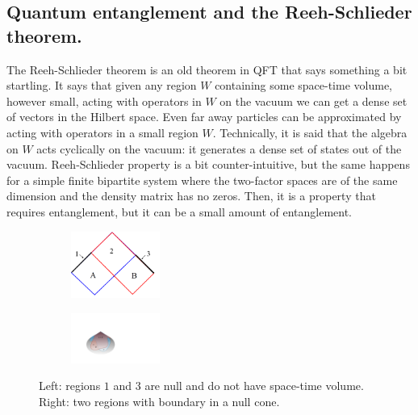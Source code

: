 \documentclass[11pt]{article}
\numberwithin{equation}{section}
\begin{document}
\subsection{Quantum entanglement and the Reeh-Schlieder theorem.}

The Reeh-Schlieder theorem is an old theorem in QFT that says something a bit startling. It says that given any region $W$ containing some space-time volume, however small, acting with operators in $W$ on the vacuum we can get a dense set of vectors in the Hilbert space. Even far away particles can be approximated by acting with operators in a small region $W$. Technically, it is said that the algebra on $W$ acts cyclically on the vacuum: it generates a dense set of states out of the vacuum. Reeh-Schlieder property is a bit counter-intuitive, but the same happens for a simple finite bipartite system where the two-factor spaces are of the same dimension and the density matrix has no zeros. Then, it is a property that requires entanglement, but it can be a small amount of entanglement.   

\begin{figure}[t]  
\begin{subfigure}
\centering
\hspace{1.3cm}\includegraphics[width=0.32\textwidth]{segmento.png}
\end{subfigure}
\hspace{2cm}
\begin{subfigure}
\centering
\includegraphics[width=0.32\textwidth]{enelcono.pdf}
\end{subfigure}
\captionsetup{width=0.9\textwidth}
\caption{Left: regions $1$ and $3$ are null and do not have space-time volume. Right: two regions with boundary in a null cone. }
\label{cono1}
\end{figure}  
\end{document}
